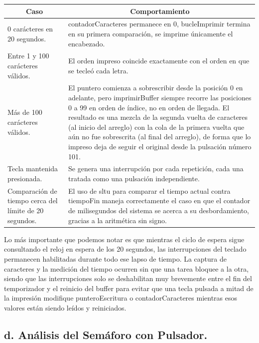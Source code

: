 \documentclass[12pt, letterpaper]{article}
\begin{document}
\begin{table}[H]
    \centering
    \begin{tabularx}{\linewidth}{| p{4.2cm} | X |}
        \hline
        \multicolumn{1}{|c|}{\textbf{Caso}} & 
        \multicolumn{1}{c|}{\textbf{Comportamiento}} \\
        \hline
        0 carácteres en 20 segundos.& contadorCaracteres permanece en 0, bucleImprimir termina en su primera comparación, se imprime únicamente el encabezado.\\
        \hline
        Entre 1 y 100 carácteres válidos.& El orden impreso coincide exactamente con el orden en que se tecleó cada letra.\\
        \hline
        Más de 100 carácteres válidos.& El puntero comienza a sobrescribir desde la posición 0 en adelante, pero imprimirBuffer siempre recorre las posiciones 0 a 99 en orden de índice, no en orden de llegada. El resultado es una mezcla de la segunda vuelta de caracteres (al inicio del arreglo) con la cola de la primera vuelta que aún no fue sobrescrita (al final del arreglo), de forma que lo impreso deja de seguir el original desde la pulsación número 101.\\
        \hline
 Tecla mantenida presionada.& Se genera una interrupción por cada repetición, cada una tratada como una pulsación independiente.\\\hline
 Comparación de tiempo cerca del límite de 20 segundos.& El uso de sltu para comparar el tiempo actual contra tiempoFin maneja correctamente el caso en que el contador de milisegundos del sistema se acerca a su desbordamiento, gracias a la aritmética sin signo.\\\hline
    \end{tabularx}
\end{table}

Lo más importante que podemos notar es que mientras el ciclo de espera sigue consultando el reloj en espera de los 20 segundos, las interrupciones del teclado permanecen habilitadas durante todo ese lapso de tiempo. La captura de caracteres y la medición del tiempo ocurren sin que una tarea bloquee a la otra, siendo que las interrupciones solo se deshabilitan muy brevemente entre el fin del temporizador y el reinicio del buffer para evitar que una tecla pulsada a mitad de la impresión modifique punteroEscritura o contadorCaracteres mientras esos valores están siendo leídos y reiniciados.

\subsection*{d. Análisis del Semáforo con Pulsador.}
\end{document}
